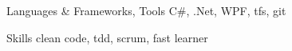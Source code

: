

\begin{cvskills}

  \cvskill
    {Languages \& Frameworks, Tools}
    {C\#, .Net, WPF, tfs, git}

  \cvskill
    {Skills}
    {clean code, tdd, scrum, fast learner}

\end{cvskills}
